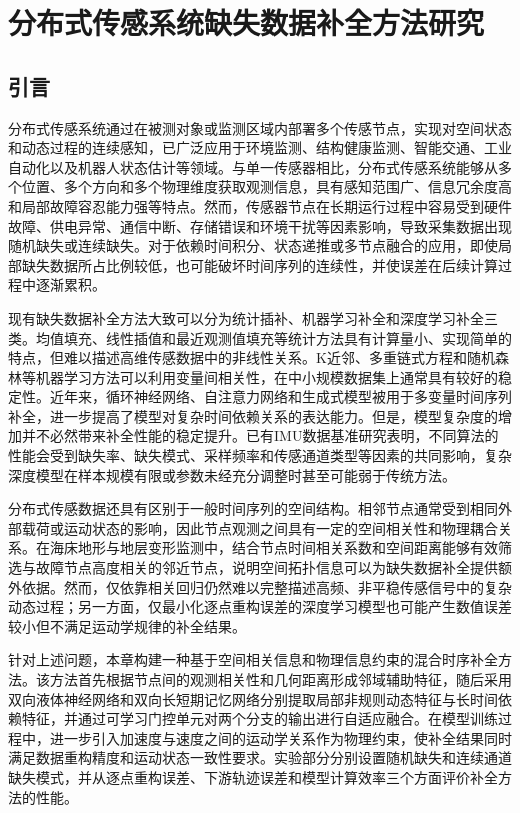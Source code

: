 \chapter{分布式传感系统缺失数据补全方法研究}
\label{chap:missing_data}
\section{引言}

分布式传感系统通过在被测对象或监测区域内部署多个传感节点，实现对空间状态和动态过程的连续感知，已广泛应用于环境监测、结构健康监测、智能交通、工业自动化以及机器人状态估计等领域。与单一传感器相比，分布式传感系统能够从多个位置、多个方向和多个物理维度获取观测信息，具有感知范围广、信息冗余度高和局部故障容忍能力强等特点。然而，传感器节点在长期运行过程中容易受到硬件故障、供电异常、通信中断、存储错误和环境干扰等因素影响，导致采集数据出现随机缺失或连续缺失。对于依赖时间积分、状态递推或多节点融合的应用，即使局部缺失数据所占比例较低，也可能破坏时间序列的连续性，并使误差在后续计算过程中逐渐累积。

现有缺失数据补全方法大致可以分为统计插补、机器学习补全和深度学习补全三类。均值填充、线性插值和最近观测值填充等统计方法具有计算量小、实现简单的特点，但难以描述高维传感数据中的非线性关系。K近邻、多重链式方程和随机森林等机器学习方法可以利用变量间相关性，在中小规模数据集上通常具有较好的稳定性。近年来，循环神经网络、自注意力网络和生成式模型被用于多变量时间序列补全，进一步提高了模型对复杂时间依赖关系的表达能力\cite{wang2025deep,cao2018brits,du2023saits}。但是，模型复杂度的增加并不必然带来补全性能的稳定提升。已有IMU数据基准研究表明，不同算法的性能会受到缺失率、缺失模式、采样频率和传感通道类型等因素的共同影响，复杂深度模型在样本规模有限或参数未经充分调整时甚至可能弱于传统方法\cite{zhou2026benchmark}。

分布式传感数据还具有区别于一般时间序列的空间结构。相邻节点通常受到相同外部载荷或运动状态的影响，因此节点观测之间具有一定的空间相关性和物理耦合关系。在海床地形与地层变形监测中，结合节点时间相关系数和空间距离能够有效筛选与故障节点高度相关的邻近节点，说明空间拓扑信息可以为缺失数据补全提供额外依据\cite{ge2024spatiotemporal}。然而，仅依靠相关回归仍然难以完整描述高频、非平稳传感信号中的复杂动态过程；另一方面，仅最小化逐点重构误差的深度学习模型也可能产生数值误差较小但不满足运动学规律的补全结果。

针对上述问题，本章构建一种基于空间相关信息和物理信息约束的混合时序补全方法。该方法首先根据节点间的观测相关性和几何距离形成邻域辅助特征，随后采用双向液体神经网络和双向长短期记忆网络分别提取局部非规则动态特征与长时间依赖特征，并通过可学习门控单元对两个分支的输出进行自适应融合。在模型训练过程中，进一步引入加速度与速度之间的运动学关系作为物理约束，使补全结果同时满足数据重构精度和运动状态一致性要求。实验部分分别设置随机缺失和连续通道缺失模式，并从逐点重构误差、下游轨迹误差和模型计算效率三个方面评价补全方法的性能。

